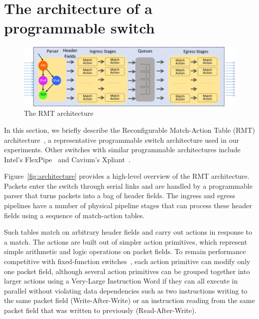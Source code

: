 \section{The architecture of a programmable switch}
\label{s:context}

\begin{figure}
\includegraphics[width=\textwidth]{p4_switch_model.png}
\caption{The RMT architecture}
\end{figure}

\label{s:architecture}
In this section, we briefly describe the Reconfigurable Match-Action Table
(RMT) architecture~\cite{rmt}, a representative programmable switch
architecture used in our experiments. Other switches with similar programmable
architectures include Intel's FlexPipe~\cite{flexpipe} and Cavium's
Xpliant~\cite{xpliant}.

Figure~\ref{fig:architecture} provides a high-level overview of the RMT
architecture. Packets enter the switch through serial links and are handled by
a programmable parser that turns packets into a bag of header fields. The
ingress and egress pipelines have a number of physical pipeline stages that can
process these header fields using a sequence of match-action tables.

Such tables match on arbitrary header fields and carry out actions in response
to a match.  The actions are built out of simpler action primitives, which
represent simple arithmetic and logic operations on packet fields. To remain
performance competitive with fixed-function switches~\cite{mellanox, broadcom},
each action primitive can modify only one packet field, although several action
primitives can be grouped together into larger actions using a Very-Large
Instruction Word if they can all execute in parallel without violating data
dependencies such as two instructions writing to the same packet field
(Write-After-Write) or an instruction reading from the same packet field that
was written to previously (Read-After-Write).

